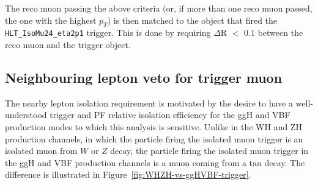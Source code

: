 The reco muon passing the above criteria (or, if more than one reco muon passed, the one with the highest $p_T$) is then matched to the object that fired the \texttt{HLT\_IsoMu24\_eta2p1} trigger. This is done by requiring $\Delta$R $<$ 0.1 between the reco muon and the trigger object.

\subsection{Neighbouring lepton veto for trigger muon\label{sec:evtsel-leptonveto}}

The nearby lepton isolation requirement is motivated by the desire to have a well-understood trigger and PF relative isolation efficiency for the ggH and VBF production modes to which this analysis is sensitive.  Unlike in the WH and ZH production channels, in which the particle firing the isolated muon trigger is an isolated muon from $W$ or $Z$ decay, the particle firing the isolated muon trigger in the ggH and VBF production channels is a muon coming from a tau decay.  The difference is illustrated in Figure~\ref{fig:WHZH-vs-ggHVBF-trigger}.

